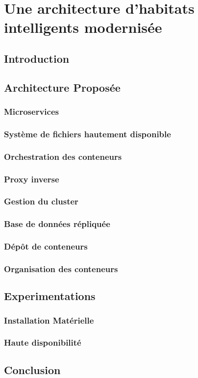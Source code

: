 \chapter{Une architecture d'habitats intelligents modernisée}
\label{chap:5}

\section{Introduction}

\section{Architecture Proposée}

\subsection{Microservices}

\subsection{Système de fichiers hautement disponible}
\subsection{Orchestration des conteneurs}
\subsection{Proxy inverse}
\subsection{Gestion du cluster}
\subsection{Base de données répliquée}
\subsection{Dépôt de conteneurs}
\subsection{Organisation des conteneurs}

\section{Experimentations}
\subsection{Installation Matérielle}
\subsection{Haute disponibilité}

\section{Conclusion}